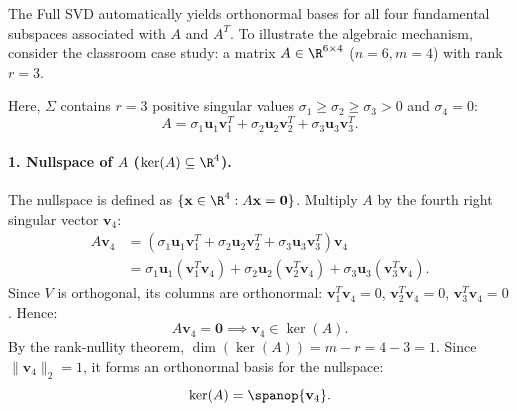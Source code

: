 The Full SVD automatically yields orthonormal bases for all four fundamental subspaces associated with $A$ and $A^T$.
To illustrate the algebraic mechanism, consider the classroom case study: a matrix $A \in \R^{6 \times 4}$ ($n = 6, m = 4$) with rank $r = 3$.

Here, $\Sigma$ contains $r = 3$ positive singular values $\sigma_1 \ge \sigma_2 \ge \sigma_3 > 0$ and $\sigma_4 = 0$:
\begin{equation}
    A = \sigma_1 \mathbf{u}_1 \mathbf{v}_1^T + \sigma_2 \mathbf{u}_2 \mathbf{v}_2^T + \sigma_3 \mathbf{u}_3 \mathbf{v}_3^T.
\end{equation}

\paragraph{1. Nullspace of $A$ ($\ker(A) \subseteq \R^4$).}
The nullspace is defined as $\{\mathbf{x} \in \R^4 : A\mathbf{x} = \mathbf{0}\}$. Multiply $A$ by the fourth right singular vector $\mathbf{v}_4$:
\begin{align}
    A \mathbf{v}_4 &= \left( \sigma_1 \mathbf{u}_1 \mathbf{v}_1^T + \sigma_2 \mathbf{u}_2 \mathbf{v}_2^T + \sigma_3 \mathbf{u}_3 \mathbf{v}_3^T \right) \mathbf{v}_4 \nonumber \\
                   &= \sigma_1 \mathbf{u}_1 (\mathbf{v}_1^T \mathbf{v}_4) + \sigma_2 \mathbf{u}_2 (\mathbf{v}_2^T \mathbf{v}_4) + \sigma_3 \mathbf{u}_3 (\mathbf{v}_3^T \mathbf{v}_4).
\end{align}
Since $V$ is orthogonal, its columns are orthonormal: $\mathbf{v}_1^T \mathbf{v}_4 = 0$, $\mathbf{v}_2^T \mathbf{v}_4 = 0$, $\mathbf{v}_3^T \mathbf{v}_4 = 0$. Hence:
\begin{equation}
    A \mathbf{v}_4 = \mathbf{0} \implies \mathbf{v}_4 \in \ker(A).
\end{equation}
By the rank-nullity theorem, $\dim(\ker(A)) = m - r = 4 - 3 = 1$. Since $\|\mathbf{v}_4\|_2 = 1$, it forms an orthonormal basis for the nullspace:
\begin{equation}
    \ker(A) = \spanop\{\mathbf{v}_4\}.
\end{equation}

